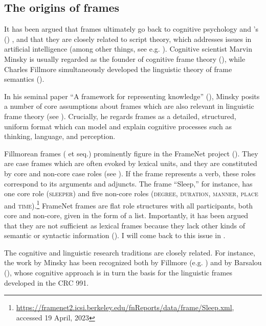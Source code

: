 \subsection{The origins of frames}
\label{sec:fr-early-origin}

It has been argued that frames ultimately go back to cognitive psychology and \citeauthor{Bartlett.1932}'s (\citeyear{Bartlett.1932}) , and that they are closely related to script theory, which addresses issues in artificial intelligence (among other things, see e.g. \citealt[20]{Busse.2012}). Cognitive scientist Marvin Minsky is usually regarded as the founder of cognitive frame theory (\citealt[]{Kann.2018}), while Charles Fillmore simultaneously developed the linguistic theory of frame semantics (\citealt[10]{Busse.2012}). 

In his seminal paper ``A framework for representing knowledge'' (\citealt{Minsky.1975}), Minsky posits a number of core assumptions about frames which are also relevant in linguistic frame theory (see \citealt{Kann.2018}). Crucially, he regards frames as a detailed, structured, uniform format which can model and explain cognitive processes such as thinking, language, and perception. 

Fillmorean frames (\citealt{Fillmore.1968} et seq.) prominently figure in the FrameNet project (\citealt{Fillmore.2003,Fillmore.2010}). They are case frames which are often evoked by lexical units, and they are constituted by core and non-core case roles (see \citealt{FrameNet.nd}). 
If the frame represents a verb, these roles correspond to its arguments and adjuncts. The frame ``Sleep,'' for instance, has one core role (\textsc{sleeper}) and five non-core roles (\textsc{degree, duration, manner, place} and \textsc{time}).\footnote{\url{https://framenet2.icsi.berkeley.edu/fnReports/data/frame/Sleep.xml}, accessed 19 April, 2023}
FrameNet frames are flat role structures with all participants, both core and non-core, given in the form of a list. 
Importantly, it has been argued that they are not sufficient as lexical frames because they lack other kinds of semantic or syntactic information (\citealt[18]{Loebner.2014a}).
I will come back to this issue in .  

The cognitive and linguistic research traditions are closely related. For instance, the work by Minsky has been recognized both by Fillmore (e.g. \citealt{Fillmore.2010}) and by Barsalou (\citeyear{Barsalou.1992a,Barsalou.1992b}), whose cognitive approach is in turn the basis for the linguistic frames developed in the CRC 991. 

